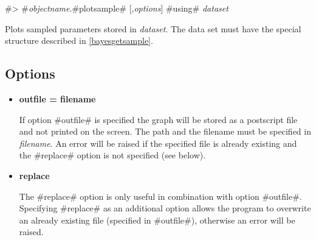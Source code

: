#> #{\em objectname}.#plotsample# [,{\em options}] #using# {\em dataset}

Plots sampled parameters stored in {\em dataset}. The data set
must have the special structure described in
\autoref{bayesgetsample}.

\subsection*{Options}

\begin{itemize}
\item {\bf outfile = filename}

If option #outfile# is specified the graph will be stored as a
postscript file and not printed on the screen. The path and the
filename must be specified in {\em filename}. An error will be
raised if the specified file is already existing and the #replace#
option is not specified (see below). \item {\bf replace}

The #replace# option is only useful in combination with option
#outfile#. Specifying #replace# as an additional option allows the
program to overwrite an already existing file (specified in
#outfile#), otherwise an error will be raised.
\end{itemize}
